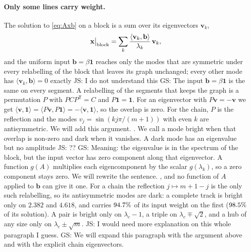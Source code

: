 \documentclass[11pt,a4paper]{article}
\newcommand{\js}[1]{{\color{blue} JS: #1 }}
\newcommand{\gs}[1]{{\color{orange!85!black} GS: #1 }}
\begin{document}
\paragraph{Only some lines carry weight.}
The solution to \eqref{eq:Axb} on a block is a sum over its eigenvectors $\mathbf{v}_k$,
\begin{equation}
\mathbf{x}\big|_{\rm block}=\sum_k\frac{\langle\mathbf{v}_k,\mathbf{b}\rangle}{\lambda_k}\,\mathbf{v}_k ,
\end{equation}
and the uniform input $\mathbf{b}=\beta\mathbf{1}$ reaches only the modes that are symmetric under
every relabelling of the block that leaves its graph unchanged; every other mode has
$\langle\mathbf{v}_k,\mathbf{b}\rangle=0$ exactly \js{I do not understand this} \gs{The input $\mathbf{b}=\beta\mathbf{1}$ is the same on every segment. A relabelling of the segments that keeps the graph is a permutation $P$ with $PCP^{\mathsf T}=C$ and $P\mathbf{1}=\mathbf{1}$. For an eigenvector with $P\mathbf{v}=-\mathbf{v}$ we get $\langle\mathbf{v},\mathbf{1}\rangle=\langle P\mathbf{v},P\mathbf{1}\rangle=-\langle\mathbf{v},\mathbf{1}\rangle$, so the overlap is zero. For the chain, $P$ is the reflection and the modes $v_j=\sin(kj\pi/(m+1))$ with even $k$ are antisymmetric. We will add this argument.}. We call a mode bright when that overlap is non-zero and
dark when it vanishes. A dark mode has an eigenvalue but no amplitude \js{??} \gs{Meaning: the eigenvalue is in the spectrum of the block, but the input vector has zero component along that eigenvector. A function $g(A)$ multiplies each eigencomponent by the scalar $g(\lambda_k)$, so a zero component stays zero. We will rewrite the sentence.}, and no function of $A$ applied
to $\mathbf{b}$ can give it one. For a chain the reflection $j\mapsto m+1-j$ is the only such
relabelling, so its antisymmetric modes are dark: a complete track is bright only on $2.382$ and
$4.618$, and carries $94.7\%$ of its input weight on the first
($98.5\%$ of its solution). A pair is bright only on $\lambda_c-1$, a triple on
$\lambda_c\mp\sqrt2$, and a hub of any size only on $\lambda_c\pm\sqrt m$. \js{I would need more explanation on this whole paragraph I guess.} \gs{We will expand this paragraph with the argument above and with the explicit chain eigenvectors.}
\end{document}
